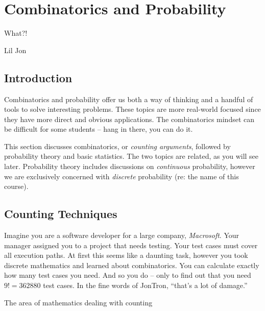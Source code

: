 \documentclass[main.tex]{subfiles}
\begin{document}
\chapter{Combinatorics and Probability}

\epigraph{What?!}{Lil Jon}

\minitoc

\section{Introduction}

Combinatorics and probability offer us both a way of thinking and a handful of tools to solve interesting problems. These topics are more real-world focused since they have more direct and obvious applications. The combinatorics mindset can be difficult for some students -- hang in there, you can do it.

This section discusses combinatorics, or \textit{counting arguments}, followed by probability theory and basic statistics. The two topics are related, as you will see later. Probability theory includes discussions on \textit{continuous} probability, however we are exclusively concerned with \textit{discrete} probability (re: the name of this course).

\section{Counting Techniques}

Imagine you are a software developer for a large company, \textit{Macrosoft}. Your manager assigned you to a project that needs testing. Your test cases must cover all execution paths. At first this seems like a daunting task, however you took discrete mathematics and learned about combinatorics. You can calculate exactly how many test cases you need. And so you do -- only to find out that you need \(9! = 362880\) test cases. In the fine words of JonTron, ``that's a lot of damage.''

\begin{defn}
	The area of mathematics dealing with counting
\end{defn}

\end{document}
